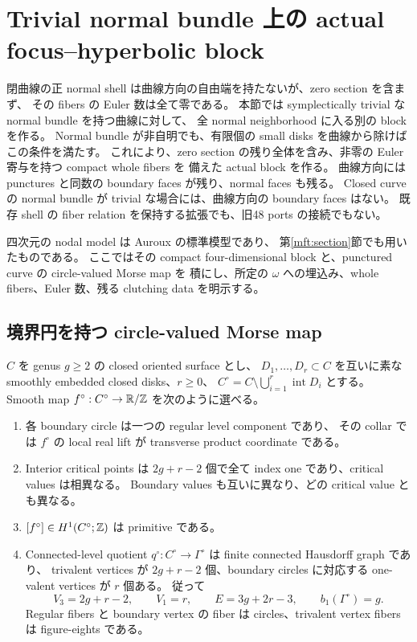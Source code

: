 \section{Trivial normal bundle 上の actual focus--hyperbolic block}
\label{fhr:section}

閉曲線の正 normal shell は曲線方向の自由端を持たないが、zero section を含まず、
その fibers の Euler 数は全て零である。
本節では symplectically trivial な normal bundle を持つ曲線に対して、
全 normal neighborhood に入る別の block を作る。
Normal bundle が非自明でも、有限個の small disks を曲線から除けばこの条件を満たす。
これにより、zero section の残り全体を含み、非零の Euler 寄与を持つ compact whole fibers を
備えた actual block を作る。
曲線方向には punctures と同数の boundary faces が残り、normal faces も残る。
Closed curve の normal bundle が trivial な場合には、曲線方向の boundary faces はない。
既存 shell の fiber relation を保持する拡張でも、旧48 ports の接続でもない。

四次元の nodal model は Auroux \cite[Section 5.1]{auroux-local} の標準模型であり、
第\ref{mft:section}節でも用いたものである。
ここではその compact four-dimensional block と、punctured curve の circle-valued Morse map を
積にし、所定の $\omega$ への埋込み、whole fibers、Euler 数、残る clutching data を明示する。

\subsection{境界円を持つ circle-valued Morse map}

\begin{lemma}\label{fhr:curve-morse}
$C$ を genus $g\ge2$ の closed oriented surface とし、
$D_1,\ldots,D_r\subset C$ を互いに素な smoothly embedded closed disks、$r\ge0$、
$C^\circ=C\setminus\bigcup_{i=1}^r\operatorname{int}D_i$ とする。
Smooth map $f^\circ:C^\circ\to\mathbb R/\mathbb Z$ を次のように選べる。
\begin{enumerate}
\item 各 boundary circle は一つの regular level component であり、
その collar では $f^\circ$ の local real lift が transverse product coordinate である。
\item Interior critical points は $2g+r-2$ 個で全て index one であり、critical values は相異なる。
Boundary values も互いに異なり、どの critical value とも異なる。
\item $[f^\circ]\in H^1(C^\circ;\mathbb Z)$ は primitive である。
\item Connected-level quotient $q^\circ:C^\circ\to\Gamma^\circ$ は finite connected Hausdorff graph であり、
trivalent vertices が $2g+r-2$ 個、boundary circles に対応する one-valent vertices が $r$ 個ある。
従って
\begin{equation}\label{fhr:graph-counts}
 V_3=2g+r-2,\qquad V_1=r,\qquad
 E=3g+2r-3,\qquad b_1(\Gamma^\circ)=g.
\end{equation}
Regular fibers と boundary vertex の fiber は circles、trivalent vertex fibers は figure-eights である。
\end{enumerate}
\end{lemma}

